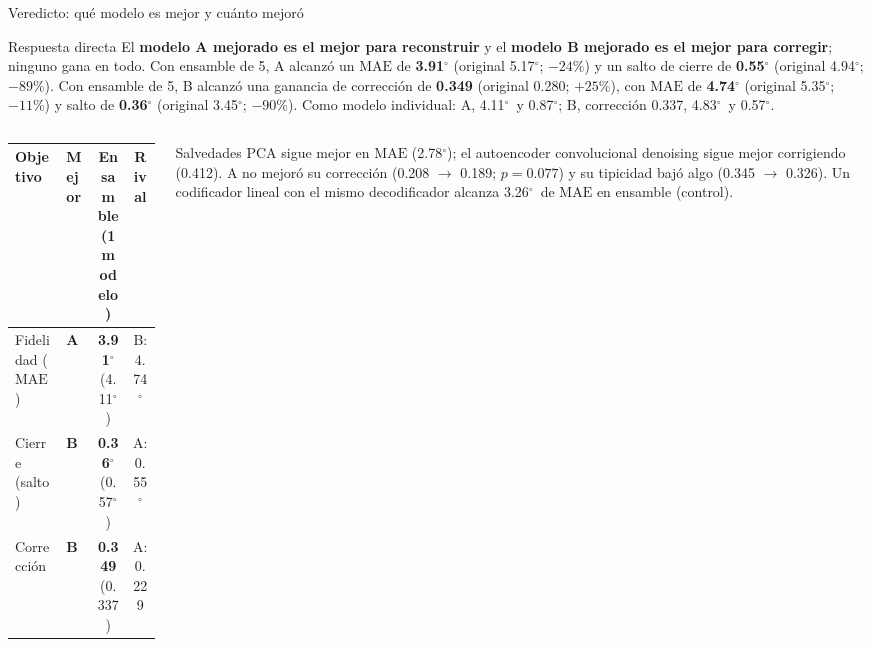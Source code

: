 \documentclass[aspectratio=169,10pt,t]{beamer}
\newcommand{\gr}{$^\circ$}
\newcommand{\mae}{\ensuremath{\mathrm{MAE}}}
\begin{document}
\begin{frame}{Veredicto: qué modelo es mejor y cuánto mejoró}
\begin{block}{Respuesta directa}
El \textbf{modelo A mejorado es el mejor para reconstruir} y el \textbf{modelo B mejorado es el mejor para corregir}; ninguno gana en todo. Con ensamble de 5, A alcanzó un \mae{} de \textbf{3.91\gr} (original 5.17\gr; $-24\%$) y un salto de cierre de \textbf{0.55\gr} (original 4.94\gr; $-89\%$). Con ensamble de 5, B alcanzó una ganancia de corrección de \textbf{0.349} (original 0.280; $+25\%$), con \mae{} de \textbf{4.74\gr} (original 5.35\gr; $-11\%$) y salto de \textbf{0.36\gr} (original 3.45\gr; $-90\%$). Como modelo individual: A, 4.11\gr\ y 0.87\gr; B, corrección 0.337, 4.83\gr\ y 0.57\gr.
\end{block}
\vspace{2pt}
\begin{columns}[T]
\begin{column}{0.56\textwidth}
\footnotesize\setlength{\tabcolsep}{3pt}
\begin{tabular}{@{}llcc@{}}
\toprule
\textbf{Objetivo} & \textbf{Mejor} & \textbf{Ensamble (1 modelo)} & \textbf{Rival}\\
\midrule
Fidelidad (\mae{}) & \textbf{A} & \textbf{3.91\gr} (4.11\gr) & B: 4.74\gr\\
Cierre (salto) & \textbf{B} & \textbf{0.36\gr} (0.57\gr) & A: 0.55\gr\\
Corrección & \textbf{B} & \textbf{0.349} (0.337) & A: 0.229\\
\bottomrule
\end{tabular}
\end{column}
\begin{column}{0.42\textwidth}
\begin{alertblock}{Salvedades}\scriptsize
PCA sigue mejor en \mae{} (2.78\gr); el autoencoder convolucional denoising sigue mejor corrigiendo (0.412). A no mejoró su corrección (0.208 $\to$ 0.189; $p=0.077$) y su tipicidad bajó algo (0.345 $\to$ 0.326). Un codificador lineal con el mismo decodificador alcanza 3.26\gr\ de \mae{} en ensamble (control).
\end{alertblock}
\end{column}
\end{columns}
\end{frame}
\end{document}

